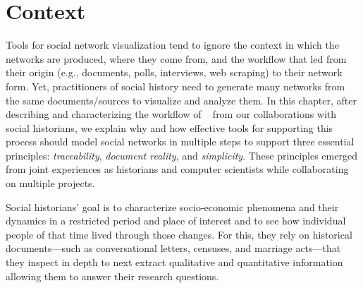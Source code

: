 
\section{Context}

Tools for social network visualization tend to ignore the context in which the networks are produced, where they come from, and the workflow that led from their origin (e.g., documents, polls, interviews, web scraping) to their network form.
Yet, practitioners of social history need to generate many networks from the same documents/sources to visualize and analyze them.
In this chapter, after describing and characterizing the workflow of \hsna~\cite{wetherellHistoricalSocialNetwork1998} from our collaborations with social historians, we explain why and how effective tools for supporting this process should model social networks in multiple steps to support three essential principles: \emph{traceability}, \emph{document reality}, and \emph{simplicity}.
These principles emerged from joint experiences as historians and computer scientists while collaborating on multiple projects.

Social historians' goal is to characterize socio-economic phenomena and their dynamics in a restricted period and place of interest and to see how individual people of that time lived through those changes\cite{tilly1984retrieving}.
For this, they rely on historical documents---such as conversational letters, censuses, and marriage acts---that they inspect in depth to next extract qualitative and quantitative information allowing them to answer their research questions.

